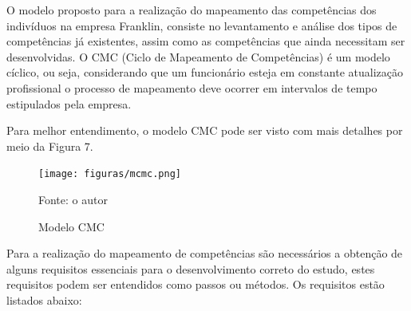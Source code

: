 O modelo proposto para a realização do mapeamento das competências dos indivíduos na empresa Franklin, consiste no levantamento e análise dos tipos de competências já existentes, assim como as competências que ainda necessitam ser desenvolvidas. O CMC (Ciclo de Mapeamento de Competências) é um modelo cíclico, ou seja, considerando que um funcionário esteja em constante atualização profissional o processo de mapeamento deve ocorrer em intervalos de tempo estipulados pela empresa.

Para melhor entendimento, o modelo CMC pode ser visto com mais detalhes por meio da Figura 7.

\vspace{32mm}

\begin{figure}[htbp]
	\centering
	\label{fig:CMC}
	\caption{Modelo CMC}
	\centering
	\texttt{[image: figuras/mcmc.png]}

	\footnotesize Fonte: o autor
\end{figure}

Para a realização do mapeamento de competências são necessários a obtenção de alguns requisitos essenciais para o desenvolvimento correto do estudo, estes requisitos podem ser entendidos como passos ou métodos. Os requisitos estão listados abaixo:

